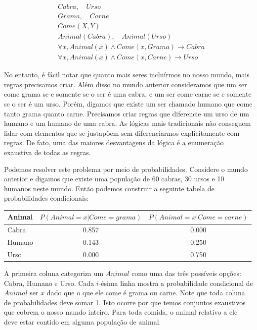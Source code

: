 \documentclass[a4paper,10pt]{article}
\theoremstyle{plain}
\begin{document}
\begin{align*}
  &Cabra, \quad Urso \\
  &Grama, \quad Carne \\
  &Come(X, Y) \\
  &Animal(Cabra), \quad Animal(Urso) \\
  &\forall x, Animal(x) \land Come(x, Grama) \to Cabra \\
  &\forall x, Animal(x) \land Come(x, Carne) \to Urso
\end{align*}

No entanto, é fácil notar que quanto mais seres incluírmos no nosso mundo, mais regras precisamos
criar. Além disso no mundo anterior consideramos que um ser come grama se e somente se o ser é uma
cabra, e um ser come carne se e somente se o ser é um urso. Porém, digamos que existe um ser
chamado humano que come tanto grama quanto carne. Precisamos criar regras que diferencie um urso de
um humano e um humano de uma cabra. As lógicas mais tradicionais não conseguem lidar com elementos
que se justapõem sem diferenciarmos explicitamente com regras. De fato, uma das maiores
desvantagens da lógica é a enumeração exaustiva de todas as regras.

Podemos resolver este problema por meio de probabilidades. Considere o mundo anterior e digamos que
existe uma população de 60 cabras, 30 ursos e 10 humanos neste mundo. Então podemos construir a
seguinte tabela de probabilidades condicionais:

\begin{table}[h]
  \begin{center}
    \begin{tabular}{l | c  c}
      Animal & $P(Animal=x | Come=grama)$ & $P(Animal=x | Come=carne)$ \\
      \hline
      Cabra & 0.857 & 0.000 \\
      Humano & 0.143 & 0.250 \\
      Urso & 0.000 & 0.750 \\
    \end{tabular}
  \end{center}
\end{table}

A primeira coluna categoriza um $Animal$ como uma das três possíveis opções: Cabra, Humano e Urso.
Cada $i$-ésima linha mostra a probabilidade condicional de $Animal$ ser $x$ dado que o que ele come
é grama ou carne. Note que toda coluna de probabilidades deve somar 1. Isto ocorre por que
temos conjuntos exaustivos que cobrem o nosso mundo inteiro. Para toda comida, o animal relativo
a ele deve estar contido em alguma população de animal.
\end{document}
